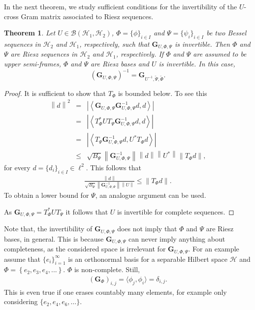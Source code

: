 \documentclass{birkjour}
\newtheorem{thm}{Theorem}[section]
\theoremstyle{definition}
\theoremstyle{remark}
\numberwithin{equation}{section}
\def\Hil{\mathcal{H}}
\newcommand{\BL}[1]{
{\mathcal B} \left( #1 \right)
}
\begin{document}
In the next theorem, we study sufficient conditions  for the invertibility of the $U$-cross Gram matrix associated to Riesz sequences.
 \begin{thm} \label{sec:invertRiesz1}
 Let $U\in \BL{ \Hil_1,\Hil_2}$, $\Phi=\{\phi\}_{i\in I}$ and $\Psi=\{\psi_{i}\}_{i\in I}$ be two
 Bessel sequences in $\mathcal{H}_2$ and $\Hil_1$, respectively, such that $\mathbf{G}_{U,\Phi,\Psi}$ is
  invertible. Then $\Phi$ and $\Psi$ are Riesz sequences in $\mathcal{H}_2$ and $\Hil_1$, respectively.
    If $\Phi$ and $\Psi$ are assumed to be upper semi-frames, $\Phi$ and $\Psi$ are Riesz bases and $U$ is invertible.
    In this case, \begin{equation*} \label{eq:forminvers}
 \left(\mathbf{G}_{U,\Phi,\Psi}\right)^{-1}=\mathbf{G}_{U^{-1},\widetilde{\Psi},
\widetilde{\Phi}}.
\end{equation*}
 \end{thm}
 \begin{proof}
It is sufficient to show that $T_{\Phi}$
is bounded below.
To see this
 \begin{eqnarray*}
 \left\|d\right\|^{2}&=&\left|\left\langle \mathbf{G}_{U,\Phi,\Psi}\mathbf{G}_{U,\Phi,\Psi}^{-1}d,d\right\rangle\right|\\
 &=&\left|\left\langle T_{\Phi}^{*}UT_{\Psi}\mathbf{G}_{U,\Phi,\Psi}^{-1}d
 ,d\right\rangle\right|\\
 &=&\left|\left\langle T_{\Psi}\mathbf{G}_{U,\Phi,\Psi}^{-1}d,U^{*}T_{\Phi}d
 \right\rangle\right|\\
 &\leq & \sqrt{B_{\Psi}}\left\|\mathbf{G}_{U,\Phi,\Psi}^{-1}\right\|\left\|d\right\|\left\|U^{*}\right\|
 \left\|T_{\Phi}d\right\|,
 \end{eqnarray*}
 for every $d=\{d_{i}\}_{i\in I}\in \ell^{2}$. This follows that
 \begin{eqnarray*}
 \frac{\left\|d\right\|}{\sqrt{B_{\Psi}}\left\|\mathbf{G}_{U,\Phi,\Psi}^{-1}\right\|\left\|U
 \right\|}\leq \left\|T_{\Phi}d\right\|.
 \end{eqnarray*}
 To obtain a lower bound for $\Psi$, an analogue argument can be used.

As $\mathbf{G}_{U,\Phi,\Psi}=T_{\Phi}^* UT_{\Psi}$ it follows that $U$  is invertible for complete sequences.

 \end{proof}
Note that, the invertibility of $\mathbf{G}_{U,\Phi,\Psi}$ does
not imply that $\Phi$ and $\Psi$ are Riesz bases, in general. This is because $\mathbf{G}_{U,\Phi,\Psi}$ can never imply anything about completeness, as the considered space is irrelevant for $\mathbf{G}_{U,\Phi,\Psi}$. For an example assume that
$\{e_{i}\}_{i=1}^{\infty}$ is an orthonormal basis for a
separable Hilbert space $\mathcal{H}$ and $\Phi=\left\{e_{2},e_{3},e_{4},...\right\}$. $\Phi$ is
 non-complete. Still,
\begin{eqnarray*}
\left(\mathbf{G}_{\Phi}\right)_{i,j}=\langle \phi_{j},\phi_{i}\rangle
=\delta_{i,j}.
\end{eqnarray*}
This is even true if one erases countably many elements, for example only considering $\{e_2, e_4, e_6,\dots\}$.
\end{document}
